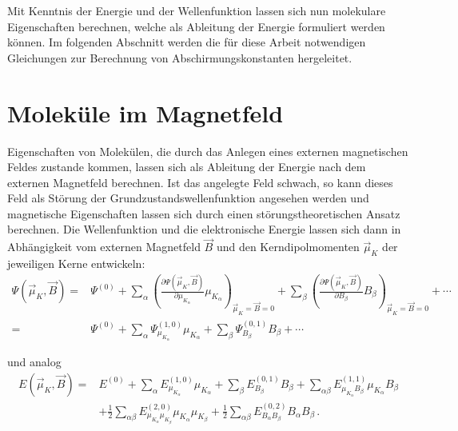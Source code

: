 Mit Kenntnis der Energie und der Wellenfunktion lassen sich nun molekulare Eigenschaften berechnen, welche als Ableitung der Energie formuliert werden können. Im folgenden Abschnitt werden die für diese Arbeit notwendigen Gleichungen zur Berechnung von Abschirmungskonstanten hergeleitet.    

\vfill
\newpage
\section{Moleküle im Magnetfeld}\label{kap:magnetfeld}

Eigenschaften von Molekülen, die durch das Anlegen eines externen magnetischen Feldes zustande kommen, lassen sich als Ableitung der Energie nach dem externen Magnetfeld berechnen. Ist das angelegte Feld schwach, so kann dieses Feld als Störung der Grundzustandswellenfunktion angesehen werden und magnetische Eigenschaften lassen sich durch einen störungstheoretischen Ansatz berechnen. Die Wellenfunktion und die elektronische Energie lassen sich dann in Abhängigkeit vom externen Magnetfeld $\vec{B}$ und den Kerndipolmomenten $\vec{\mu}_K$ der jeweiligen Kerne entwickeln:\supercite{ditchfield1974self} 
\begingroup
\small
\begin{equation}
\begin{aligned}
\Psi(\vec{\mu}_K,\vec{B})=&\Psi^{(0)}+\sum_{\alpha}\left(\frac{\partial\Psi(\vec{\mu}_K,\vec{B})}{\partial \mu_{K_\alpha}}\mu_{K_\alpha}\right)_{\vec{\mu}_K=\vec{B}=0}+\sum_\beta\left(\frac{\partial\Psi(\vec{\mu}_K,\vec{B})}{\partial B_\beta}B_\beta\right)_{\vec{\mu}_K=\vec{B}=0}+\cdots\\
=&\Psi^{(0)}+\sum_{\alpha}\Psi_{\mu_{K_\alpha}}^{(1,0)}\mu_{K_\alpha}+\sum_\beta\Psi_{B_\beta}^{(0,1)}B_\beta+\cdots
\end{aligned}
\end{equation}
\endgroup

und analog
\begin{equation}\label{eq:evonbmu0}
\begin{aligned}
E(\vec{\mu}_K,\vec{B})=&E^{(0)}+\sum_{\alpha} E^{(1,0)}_{\mu_{K_\alpha}} \mu_{K_\alpha}+\sum_\beta E^{(0,1)}_{B_\beta} B_\beta+\sum_{\alpha\beta} E^{(1,1)}_{\mu_{K_\alpha}B_\beta} \mu_{K_\alpha}B_\beta\\
&+\frac{1}{2}\sum_{\alpha\beta} E^{(2,0)}_{\mu_{K_\alpha}\mu_{K_\beta}}\mu_{K_\alpha}\mu_{K_\beta}+\frac{1}{2}\sum_{\alpha\beta} E^{(0,2)}_{B_\alpha B_\beta}B_\alpha B_\beta\, .
\end{aligned}
\end{equation}

